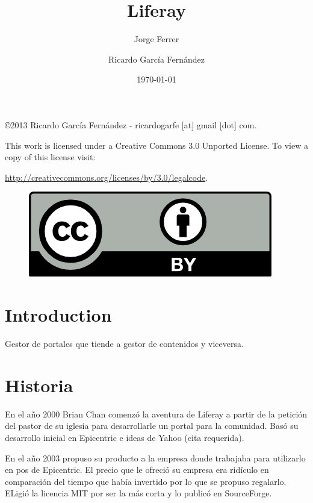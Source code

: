 \documentclass[11pt]{scrartcl}
\title{\textbf{Liferay}}
\subtitle{Jorge Ferrer}
\author{Ricardo Garc\'ia Fern\'andez}
\date{\today}
\begin{document}
\maketitle

\vfill

\begin{flushright}
    \copyright  2013 Ricardo Garc\'ia Fern\'andez - ricardogarfe [at] gmail [dot] com.

    This work is licensed under a Creative Commons 3.0 Unported License.
    To view a copy of this license visit:
 
    \url{http://creativecommons.org/licenses/by/3.0/legalcode}.
\end{flushright}

\begin{figure}[h]
    \begin{flushright}	
        \includegraphics{by}
        \label{fig:by}
    \end{flushright}
\end{figure}

\newpage

\section{Introduction}

\par Gestor de portales que tiende a gestor de contenidos y viceversa.

\section{Historia}
\label{sec:history}

\par En el año 2000 Brian Chan comenz\'o la aventura de Liferay a partir de la petici\'on del pastor de su iglesia para desarrollarle un portal para la comunidad. Bas\'o su desarrollo inicial en Epicentric e ideas de Yahoo (cita requerida).

\par En el año 2003 propuso su producto a la empresa donde trabajaba para utilizarlo en pos de Epicentric. El precio que le ofreci\'o su empresa era rid\'iculo en comparaci\'on del tiempo que hab\'ia invertido por lo que se propuso regalarlo. ELigi\'o la licencia MIT por ser la m\'as corta y lo public\'o en SourceForge.
\end{document}
